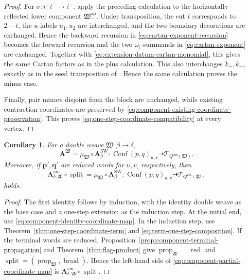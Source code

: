 \documentclass[10pt,a4paper]{article}
\newtheorem{corollary}[theorem]{Corollary}
\theoremstyle{definition}
\theoremstyle{remark}
\newcommand{\Conf}{\operatorname{Conf}}
\newcommand{\Tcal}{\mathcal T}
\newcommand{\fW}{\mathfrak W}
\newcommand{\Split}{\operatorname{split}}
\begin{document}
\begin{proof}
For \(\sigma:i^-i^-\to i^-\), apply the preceding calculation to the
horizontally reflected lower component \(\fW_-^{\mathrm{op}}\).  Under
transposition, the cut \(t\) corresponds to \(2-t\), the \(u\)-labels
\(u_1,u_2\) are interchanged, and the two boundary decorations are exchanged.
Hence the backward recursion in
\eqref{eq:cartan-exponent-recursion} becomes the forward recursion and
the two \(\omega_i\)-summands in \eqref{eq:cartan-exponent} are exchanged.
Together with \eqref{eq:extension-datum-cartan-monomial}, this gives the same
Cartan factors as in the plus calculation.  This also interchanges
\(k_-,k_+\), exactly as in the
seed transposition of
\cite[Proposition~3.9]{ShenWeng2021}.  Hence the same calculation proves the
minus case.

Finally, pair minors disjoint from the block are unchanged, while existing
contraction coordinates are preserved by
\eqref{eq:component-existing-coordinate-preservation}.  This proves
\eqref{eq:one-step-coordinate-compatibility} at every vertex.
\end{proof}

\begin{corollary}
\label{cor:reduced-iterated-coordinate-term}
For a double weave \(\fW:\beta\to\delta\),
\[
 \mathbf A^\fW
 =\mu_\fW\circ\mathbf A_\beta^{\mathrm{SW}}:
 \Conf(p,q)_{u,v}
 \dashrightarrow\Tcal_{Q^{\mathrm{am}}(\fW)}.
\]
Moreover, if \(\mathbf p',\mathbf q'\) are reduced words for \(u,v\),
respectively, then
\begin{equation}
 \mathbf A_{\delta,\fW}^{\mathrm{am}}\circ\Split
 =\mu_\fW\circ\mathbf A_\beta^{\mathrm{SW}}:
 \Conf(p,q)_{u,v}
 \dashrightarrow\Tcal_{Q^{\mathrm{am}}(\fW)}
 \label{eq:iterated-component-coordinate-term}
\end{equation}
holds.
\end{corollary}

\begin{proof}
The first identity follows by induction, with the identity double weave as the
base case and a one-step extension as the induction step.  At the initial end,
use \eqref{eq:component-identity-coordinate-map}.  In the induction
step, use Theorem~\ref{thm:one-step-coordinate-term} and
\eqref{eq:term-one-step-composition}.  If the terminal words are
reduced, Proposition~\ref{prop:component-terminal-propagation} and
Theorem~\ref{thm:flag-product} give
\(\operatorname{prop}_{\fW}=\operatorname{red}\) and
\(\Split=(\operatorname{prop}_{\fW},\operatorname{braid})\).  Hence the
left-hand side of \eqref{eq:component-partial-coordinate-map} is
\(\mathbf A_{\delta,\fW}^{\mathrm{am}}\circ\Split\).
\end{proof}
\end{document}
